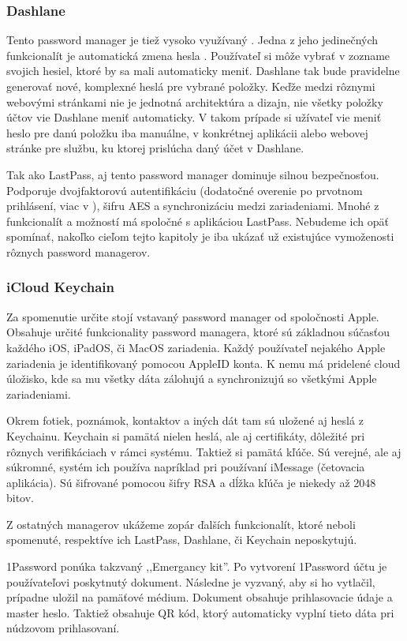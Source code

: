 \subsubsection{Dashlane}
Tento password manager je tiež vysoko využívaný \cite{15}. Jedna z jeho jedinečných funkcionalít je automatická zmena hesla \cite{16}. Používateľ si môže vybrať v zozname svojich hesiel, ktoré by sa mali automaticky meniť. Dashlane tak bude pravidelne generovať nové, komplexné heslá pre vybrané položky. Keďže medzi rôznymi webovými stránkami nie je jednotná architektúra a dizajn, nie všetky položky účtov vie Dashlane meniť automaticky. V takom prípade si užívateľ vie meniť heslo pre danú položku iba manuálne, v konkrétnej aplikácii alebo webovej stránke pre službu, ku ktorej prislúcha daný účet v Dashlane.
\par Tak ako LastPass, aj tento password manager dominuje silnou bezpečnosťou. Podporuje dvojfaktorovú autentifikáciu (dodatočné overenie po prvotnom prihlásení, viac v \cite{17}), šifru AES a synchronizáciu medzi zariadeniami. Mnohé z funkcionalít a možností má spoločné s aplikáciou LastPass. Nebudeme ich opäť spomínať, nakoľko cieľom tejto kapitoly je iba ukázať už existujúce vymoženosti rôznych password managerov.

\subsubsection{iCloud Keychain}
\par Za spomenutie určite stojí vstavaný password manager od spoločnosti Apple. Obsahuje určité funkcionality password managera, ktoré sú základnou súčasťou každého iOS, iPadOS, či MacOS zariadenia. Každý používateľ nejakého Apple zariadenia je identifikovaný pomocou AppleID konta. K nemu má pridelené cloud úložisko, kde sa mu všetky dáta zálohujú a synchronizujú so všetkými Apple zariadeniami.
\par Okrem fotiek, poznámok, kontaktov a iných dát tam sú uložené aj heslá z Keychainu. Keychain si pamätá nielen heslá, ale aj certifikáty, dôležité pri rôznych verifikáciach v rámci systému. Taktiež si pamätá kľúče. Sú verejné, ale aj súkromné, systém ich používa napríklad pri používaní iMessage (četovacia aplikácia). Sú šifrované pomocou šifry RSA a dĺžka kľúča je niekedy až 2048 bitov. \\

\par Z ostatných managerov ukážeme zopár ďalších funkcionalít, ktoré neboli spomenuté, respektíve ich LastPass, Dashlane, či Keychain neposkytujú.
\par 1Password ponúka takzvaný ,,Emergancy kit''. Po vytvorení 1Password účtu je používateľovi poskytnutý dokument. Následne je vyzvaný, aby si ho vytlačil, prípadne uložil na pamäťové médium. Dokument obsahuje prihlasovacie údaje a master heslo. Taktiež obsahuje QR kód, ktorý automaticky vyplní tieto dáta pri núdzovom prihlasovaní. \\

